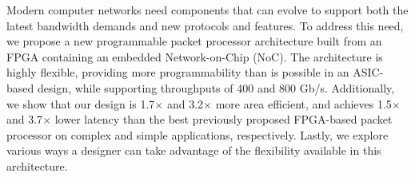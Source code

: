 Modern computer networks need components that can evolve to support both the latest bandwidth demands and new protocols and features.
To address this need, we propose a new programmable packet processor architecture built from an FPGA containing an embedded Network-on-Chip (NoC).
The architecture is highly flexible, providing more programmability than is possible in an ASIC-based design, while supporting throughputs of 400 and 800 Gb/s.
Additionally, we show that our design is 1.7$\times$ and 3.2$\times$ more area efficient, and achieves 1.5$\times$ and 3.7$\times$ lower latency than the best previously proposed FPGA-based packet processor on complex and simple applications, respectively.
Lastly, we explore various ways a designer can take advantage of the flexibility available in this architecture.

